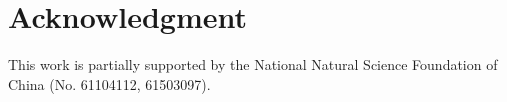 \documentclass[conference]{IEEEtran}
\theoremstyle{plain}
\begin{document}
%


















%
%
\section{Acknowledgment}
This work is partially supported by the National Natural Science Foundation of China (No. 61104112, 61503097).




\end{document}
